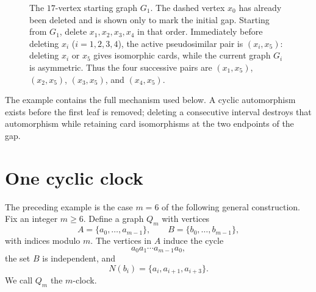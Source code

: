 \documentclass[11pt]{article}
\theoremstyle{definition}
\theoremstyle{remark}
\begin{document}
\begin{figure}[t]
\centering
{}
\caption{The $17$-vertex starting graph $G_1$.  The dashed vertex $x_0$ has already been deleted and is shown only to mark the initial gap.  Starting from $G_1$, delete $x_1,x_2,x_3,x_4$ in that order.  Immediately before deleting $x_i$ ($i=1,2,3,4$), the active pseudosimilar pair is $(x_i,x_5)$: deleting $x_i$ or $x_5$ gives isomorphic cards, while the current graph $G_i$ is asymmetric.  Thus the four successive pairs are $(x_1,x_5)$, $(x_2,x_5)$, $(x_3,x_5)$, and $(x_4,x_5)$.}
\label{fig:G17}
\end{figure}

The example contains the full mechanism used below.  A cyclic automorphism exists before the first leaf is removed; deleting a consecutive interval destroys that automorphism while retaining card isomorphisms at the two endpoints of the gap.

\section{One cyclic clock}

The preceding example is the case $m=6$ of the following general construction. Fix an integer $m\ge6$. Define a graph $Q_m$ with vertices
\[
    A=\{a_0,\ldots,a_{m-1}\},\qquad
    B=\{b_0,\ldots,b_{m-1}\},
\]
with indices modulo $m$. The vertices in $A$ induce the cycle
\[
    a_0a_1\cdots a_{m-1}a_0,
\]
the set $B$ is independent, and
\[
    N(b_i)=\{a_i,a_{i+1},a_{i+3}\}.
\]
We call $Q_m$ the $m$-clock.
\end{document}
